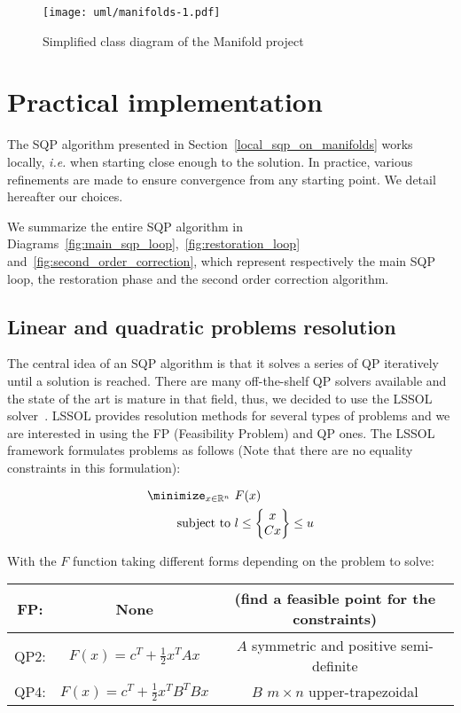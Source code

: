 \begin{figure}[htpb]
  \centering
  \texttt{[image: uml/manifolds-1.pdf]}
  \caption{Simplified class diagram of the Manifold project}
\label{fig:uml_manifold}
\end{figure}

\section{Practical implementation}
\label{sec:practical_implementation}

The SQP algorithm presented in Section~\ref{local_sqp_on_manifolds} works locally, \emph{i.e.} when starting close enough to the solution.
In practice, various refinements are made to ensure convergence from any starting point.
We detail hereafter our choices.

We summarize the entire SQP algorithm in Diagrams~\ref{fig:main_sqp_loop},~\ref{fig:restoration_loop} and~\ref{fig:second_order_correction}, which represent respectively the main SQP loop, the restoration phase and the second order correction algorithm.

\subsection{Linear and quadratic problems resolution}
\label{sub:linear_and_quadratic_problems_resolution}

The central idea of an SQP algorithm is that it solves a series of QP iteratively until a solution is reached.
There are many off-the-shelf QP solvers available and the state of the art is mature in that field, thus, we decided to use the LSSOL solver~\cite{gill:techrep:1986}.
LSSOL provides resolution methods for several types of problems and we are interested in using the FP (Feasibility Problem) and QP ones.\@
The LSSOL framework formulates problems as follows (Note that there are no equality constraints in this formulation):

\begin{align}
  \minimize_{x\in \mathbb{R}^n}\ &{F(x)}\\
  \text{subject to}\  & l\leq \begin{Bmatrix}
    x\\
    Cx
  \end{Bmatrix}
  \leq u
\end{align}

With the $F$ function taking different forms depending on the problem to solve:
\begin{table} [H]
\centering
\begin{tabular}{ccc}
  \toprule
  FP:\@ & None & (find a feasible point for the constraints)\\
  \midrule
  QP2: & $F(x)=c^T+\frac{1}{2} x^T A x$ & $A$ symmetric and positive semi-definite \\
  \midrule
  QP4: & $F(x)=c^T+\frac{1}{2} x^T B^T B x$ & $B$ $m\times n$ upper-trapezoidal \\
  \bottomrule
\end{tabular}
\end{table}

